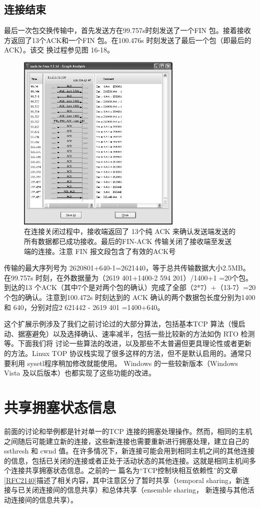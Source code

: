 \subsection{连接结束}
最后一次包交换传输中，首先发送方在99.757s时刻发送了一个FIN 包。接着接收方返回了13个ACK和一个FIN 包。在100.476s 时刻发送了最后一个包（即最后的ACK）。该交
换过程参见图 16-18。
\begin{figure}[!htb]
    \centering
	\includegraphics[width=0.7\textwidth]{imgs/16/16-18.png}
	\caption{在连接关闭过程中，接收端返回了 13个纯 ACK 来确认发送端发送的所有数据都已成功接收。最后的FIN-ACK 传输关闭了接收端至发送端的连接。注意 FIN 报文段包含了有效的ACK号}
\end{figure}

传输的最大序列号为 2620801+640-1=2621440，等于总共传输数据大小2.5MB。在99.757s 时刻，在外数据量为（2619 401+1400-2 594 201）/1400+1 =20个包。到达的13
个ACK（其中7个是对两个包的确认）完成了全部（2*7）+（13-7）=20个包的确认。注意到100.472s 时刻达到的 ACK 确认的两个数据包长度分别为1400和 640，分别对应2 621442 -
2619 401 =1400+640。

这个扩展示例涉及了我们之前讨论过的大部分算法，包括基本TCP 算法（慢启动、据塞避免）以及选择确认、速率减半，包括一些比较新的方法如伪 RTO 检测等。下面我们将
讨论一些算法的改进，以及那些不太普遍但更具理论性或者更新的方法。Linux TOP 协议栈实现了很多这样的方法，但不是默认启用的。通常只要利用 sysetl程序稍加修改就能使用。
Windows 的一些较新版本（Windows Vista 及以后版本）也都实现了这些功能的改进。

\section{共享拥塞状态信息}
前面的讨论和举例都是针对单一的TCP 连接的拥塞处理操作。然而，相同的主机之间随后可能建立新的连接，这些新连接也需要重新进行拥塞处理，建立自己的 ssthresh 和 cwnd
值。在许多情况下，新连接可能会用到相同主机之间的其他连接的信息，包括已关闭的连接或者正处于活动状态的其他连接。这就是相同主机间多个连接共享拥塞状态信息。之前的一
篇名为“TCP控制块相互依赖性”的文章\href{https://www.rfc-editor.org/rfc/rfc2140}{[RFC2140]}描述了相关内容，其中注意区分了暂时共享（temporal sharing，新连接与已关闭连接间的信息共享）和总体共享（ensemble sharing，
新连接与其他活动连接间的信息共享）。

